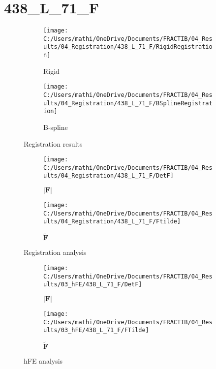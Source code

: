 \documentclass{article}%
\begin{document}
%
\newpage%
\section*{438\_L\_71\_F}%
\label{sec:438L71F}%


\begin{figure}[h!]%
\begin{subfigure}[b]{0.5\linewidth}%
\texttt{[image: C:/Users/mathi/OneDrive/Documents/FRACTIB/04\_Results/04\_Registration/438\_L\_71\_F/RigidRegistration]}%
\caption{Rigid}%
\end{subfigure}%
\begin{subfigure}[b]{0.5\linewidth}%
\texttt{[image: C:/Users/mathi/OneDrive/Documents/FRACTIB/04\_Results/04\_Registration/438\_L\_71\_F/BSplineRegistration]}%
\caption{B{-}spline}%
\end{subfigure}%
\caption{Registration results}%
\end{figure}

%


\begin{figure}[h!]%
\begin{subfigure}[b]{0.5\linewidth}%
\texttt{[image: C:/Users/mathi/OneDrive/Documents/FRACTIB/04\_Results/04\_Registration/438\_L\_71\_F/DetF]}%
\caption{$|\mathbf{F}|$}%
\end{subfigure}%
\begin{subfigure}[b]{0.5\linewidth}%
\texttt{[image: C:/Users/mathi/OneDrive/Documents/FRACTIB/04\_Results/04\_Registration/438\_L\_71\_F/Ftilde]}%
\caption{$\tilde{\mathbf{F}}$}%
\end{subfigure}%
\caption{Registration analysis}%
\end{figure}

%


\begin{figure}[h!]%
\begin{subfigure}[b]{0.5\linewidth}%
\texttt{[image: C:/Users/mathi/OneDrive/Documents/FRACTIB/04\_Results/03\_hFE/438\_L\_71\_F/DetF]}%
\caption{$|\mathbf{F}|$}%
\end{subfigure}%
\begin{subfigure}[b]{0.5\linewidth}%
\texttt{[image: C:/Users/mathi/OneDrive/Documents/FRACTIB/04\_Results/03\_hFE/438\_L\_71\_F/FTilde]}%
\caption{$\tilde{\mathbf{F}}$}%
\end{subfigure}%
\caption{hFE analysis}%
\end{figure}
\end{document}
